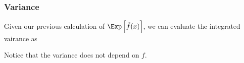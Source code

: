 \subsubsection{Variance}
Given our previous calculation of $\Exp\left[\hat{f}(x)\right]$, we can evaluate the integrated vairance as

Notice that the variance does not depend on $f$.














\newpage
\begin{comment}
\sec{Macros for frequently used notations}
Please try to reuse the macros defined below to ensure consistency.
\begin{itemize}
\item $\Exp$, 
\al{
\E_{x\sim P}, \Exp_{x\sim P} 
}
\item $\Pr[X=1\vert Y=2]$
\item 
\al{
\argmin_{x: x\ge 1}
}
\item 
$\theta$, $\theta^\star$, $\thetaerm$, 
\item 
$\cX,\cY, \cH, \cF$
\item $x\sp{1}, y\sp{k}$
\item 
$x\in \R^3, \bbZ$
\item $\err(5\theta)$
\item $O(\cdot)$, $\tilO(\cdot)$
\item $\iid$
\item $\norm{x}, \Norm{x^{2^3}}$, $\norm{x}_{2}$
\item 
\end{itemize}
\begin{theorem}
..
\end{theorem}
\begin{lemma}
...
\end{lemma}
\end{comment}
